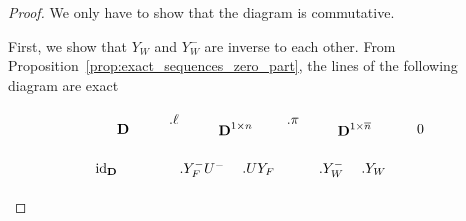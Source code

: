 \documentclass[10pt]{article}
\newcommand\g[1]{\textbf{#1}}
\newcommand\id[1]{\text{id}_{#1}}
\newcommand\D{\g{D}}
\begin{document}
\begin{proof}
  We only have to show that the diagram is commutative.
  
  First, we show that $Y_W$ and $Y_W^-$ are inverse to each other.
  From Proposition~\ref{prop:exact_sequences_zero_part}, the lines of the
  following diagram are exact
  \begin{center}
    \begin{equation}\label{equ:diagram_reduction_zero}
      \begin{tikzpicture}
        \coordinate (Rel) at (-2,0);
        \coordinate (Rels) at (-2.3, -0.2);
        \coordinate (Gen) at (0, 0);
        \coordinate (Gensl) at (0.4, -0.2);
        \coordinate (Gensr) at (0.6, -0.2);
        \coordinate (Genr) at (1.1, 0);
        \coordinate (M) at (3, 0);
        \coordinate (Msl) at (3.4, -0.2);
        \coordinate (Msr) at (3.6, -0.2);
        \coordinate (Mr) at (4.1, 0);
        \coordinate (zero) at (5, 0);

        \coordinate (R) at (-1, 0);
        \coordinate (pi) at (2, 0);

        \coordinate (Relp) at (-2,-2);
        \coordinate (Relpn) at (-2.3, -1.8);
        \coordinate (Genp) at (0, -2);
        \coordinate (Genpnl) at (0.4, -1.8);
        \coordinate (Genpnr) at (0.6, -1.8);
        \coordinate (Genrp) at (1.1, -2);
        \coordinate (Mp) at (3, -2);
        \coordinate (Mpnl) at (3.4, -1.8);
        \coordinate (Mpnr) at (3.6, -1.8);
        \coordinate (Mpr) at (4.1, -2);
        \coordinate (zerop) at (5, -2);

        \coordinate (Rp) at (-1, -2);
        \coordinate (pip) at (2, -2);

        
        \coordinate (Q) at (-2.3, -1);
        \coordinate (P) at (0.6, -1);
        \coordinate (Pp) at (0.4, -1);
        \coordinate (phi) at (3.6, -1);
        \coordinate (phip) at (3.4, -1);

        \draw[left] (Q) node {$\id{\D}$};
        \draw[left] (Pp) node {$.Y_F^-U^-$};
        \draw[right] (P) node {$.UY_F$};
        \draw[left] (phip) node {$.Y_W^-$};
        \draw[right] (phi) node {$.Y_W$};
        
        
        \draw[left] (Rel) node {$\D$};
        \draw[right] (Gen) node {$\D^{1\times n}$};
        \draw[right] (M) node {$\D^{1\times \overline{n}}
          $};
        \draw[right] (zero) node {$0$};

        \draw[above] (R) node {$.\ell$};
        \draw[above] (pi) node {$.\pi$};


\end{tikzpicture}
\end{equation}
\end{center}
\end{proof}
\end{document}
